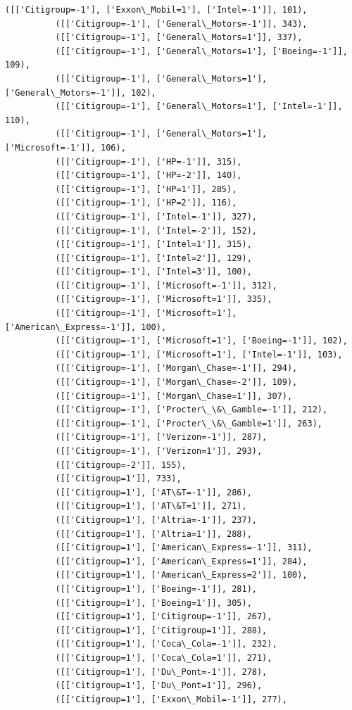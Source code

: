 \documentclass[11pt]{article}
\begin{document}
\begin{Verbatim}[commandchars=\\\{\}]
          ([['Citigroup=-1'], ['Exxon\_Mobil=1'], ['Intel=-1']], 101),
          ([['Citigroup=-1'], ['General\_Motors=-1']], 343),
          ([['Citigroup=-1'], ['General\_Motors=1']], 337),
          ([['Citigroup=-1'], ['General\_Motors=1'], ['Boeing=-1']], 109),
          ([['Citigroup=-1'], ['General\_Motors=1'], ['General\_Motors=-1']], 102),
          ([['Citigroup=-1'], ['General\_Motors=1'], ['Intel=-1']], 110),
          ([['Citigroup=-1'], ['General\_Motors=1'], ['Microsoft=-1']], 106),
          ([['Citigroup=-1'], ['HP=-1']], 315),
          ([['Citigroup=-1'], ['HP=-2']], 140),
          ([['Citigroup=-1'], ['HP=1']], 285),
          ([['Citigroup=-1'], ['HP=2']], 116),
          ([['Citigroup=-1'], ['Intel=-1']], 327),
          ([['Citigroup=-1'], ['Intel=-2']], 152),
          ([['Citigroup=-1'], ['Intel=1']], 315),
          ([['Citigroup=-1'], ['Intel=2']], 129),
          ([['Citigroup=-1'], ['Intel=3']], 100),
          ([['Citigroup=-1'], ['Microsoft=-1']], 312),
          ([['Citigroup=-1'], ['Microsoft=1']], 335),
          ([['Citigroup=-1'], ['Microsoft=1'], ['American\_Express=-1']], 100),
          ([['Citigroup=-1'], ['Microsoft=1'], ['Boeing=-1']], 102),
          ([['Citigroup=-1'], ['Microsoft=1'], ['Intel=-1']], 103),
          ([['Citigroup=-1'], ['Morgan\_Chase=-1']], 294),
          ([['Citigroup=-1'], ['Morgan\_Chase=-2']], 109),
          ([['Citigroup=-1'], ['Morgan\_Chase=1']], 307),
          ([['Citigroup=-1'], ['Procter\_\&\_Gamble=-1']], 212),
          ([['Citigroup=-1'], ['Procter\_\&\_Gamble=1']], 263),
          ([['Citigroup=-1'], ['Verizon=-1']], 287),
          ([['Citigroup=-1'], ['Verizon=1']], 293),
          ([['Citigroup=-2']], 155),
          ([['Citigroup=1']], 733),
          ([['Citigroup=1'], ['AT\&T=-1']], 286),
          ([['Citigroup=1'], ['AT\&T=1']], 271),
          ([['Citigroup=1'], ['Altria=-1']], 237),
          ([['Citigroup=1'], ['Altria=1']], 288),
          ([['Citigroup=1'], ['American\_Express=-1']], 311),
          ([['Citigroup=1'], ['American\_Express=1']], 284),
          ([['Citigroup=1'], ['American\_Express=2']], 100),
          ([['Citigroup=1'], ['Boeing=-1']], 281),
          ([['Citigroup=1'], ['Boeing=1']], 305),
          ([['Citigroup=1'], ['Citigroup=-1']], 267),
          ([['Citigroup=1'], ['Citigroup=1']], 288),
          ([['Citigroup=1'], ['Coca\_Cola=-1']], 232),
          ([['Citigroup=1'], ['Coca\_Cola=1']], 271),
          ([['Citigroup=1'], ['Du\_Pont=-1']], 278),
          ([['Citigroup=1'], ['Du\_Pont=1']], 296),
          ([['Citigroup=1'], ['Exxon\_Mobil=-1']], 277),

\end{Verbatim}
\end{document}
